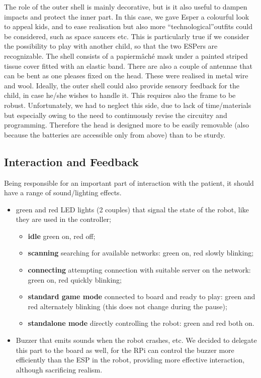 \documentclass[a4paper,twoside]{book}
\begin{document}
The role of the outer shell is mainly decorative, but is it also useful to dampen impacts and protect the inner part. In this case, we gave Esper a colourful look to appeal kids, and to ease realisation but also more \textquotedblleft technological\textquotedblright outfits could be considered, such as space saucers etc. This is particularly true if we consider the possibility to play with another child, so that the two ESPers are recognizable.
The shell consists of a papier\textendash m\^{a}ch\'{e} mask under a painted striped tissue cover fitted with an elastic band. There are also a couple of antennae that can be bent as one pleases fixed on the head. These were realised in metal wire and wool.
Ideally, the outer shell could also provide sensory feedback for the child, in case he/she wishes to handle it.
This requires also the frame to be robust. Unfortunately, we had to neglect this side, due to lack of time/materials but especially owing to the need to continuously revise the circuitry and programming. Therefore the head is designed more to be easily removable (also because the batteries are accessible only from above) than to be sturdy.

\subsection{Interaction and Feedback}

Being responsible for an important part of interaction with the patient, it should have a range of sound/lighting effects.
\begin{itemize}
\item green and red LED lights (2 couples) that signal the state of the robot, like they are used in the controller;
	\begin{itemize}
	\item \textbf{idle} green on, red off;
	\item \textbf{scanning} searching for available networks: green on, red slowly blinking;
	\item \textbf{connecting} attempting connection with suitable server on the network: green on, red quickly blinking;
	\item \textbf{standard game mode} connected to board and ready to play: green and red alternately blinking (this does not change during the pause);
	\item \textbf{standalone mode} directly controlling the robot: green and red both on.
	\end{itemize}
\item Buzzer that emits sounds when the robot crashes, etc. We decided to delegate this part to the board as well, for the RPi can control the buzzer more efficiently than the ESP in the robot, providing more effective interaction, although sacrificing realism.
\end{itemize}
\end{document}
